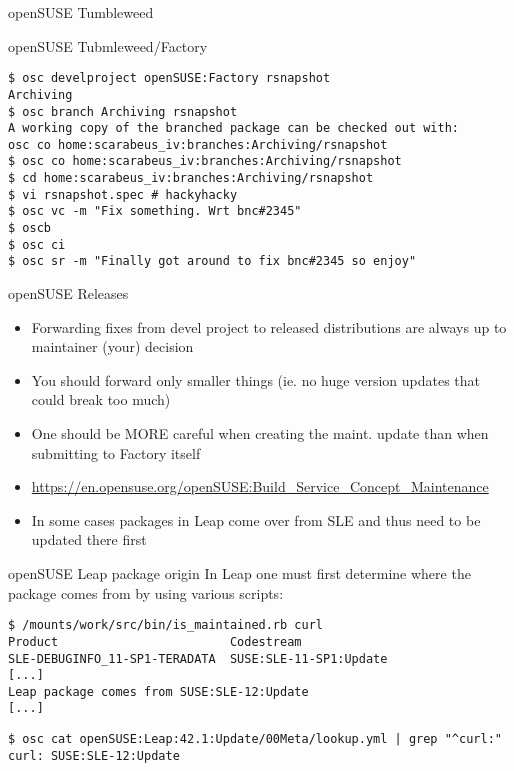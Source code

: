 \documentclass{beamer}
\begin{document}
\begin{frame}{openSUSE Tumbleweed}
\end{frame}

\begin{frame}[fragile]{openSUSE Tubmleweed/Factory}
	\begin{tiny}
	\begin{verbatim}
$ osc develproject openSUSE:Factory rsnapshot
Archiving
$ osc branch Archiving rsnapshot
A working copy of the branched package can be checked out with:
osc co home:scarabeus_iv:branches:Archiving/rsnapshot
$ osc co home:scarabeus_iv:branches:Archiving/rsnapshot
$ cd home:scarabeus_iv:branches:Archiving/rsnapshot
$ vi rsnapshot.spec # hackyhacky
$ osc vc -m "Fix something. Wrt bnc#2345"
$ oscb
$ osc ci
$ osc sr -m "Finally got around to fix bnc#2345 so enjoy"
	\end{verbatim}
	\end{tiny}
\end{frame}

\begin{frame}[t]{openSUSE Releases}
	\begin{itemize}
	\item Forwarding fixes from devel project to released distributions are always up to maintainer (your) decision
	\item You should forward only smaller things (ie. no huge version updates that could break too much)
	\item One should be MORE careful when creating the maint. update than when submitting to Factory itself
	\item \url{https://en.opensuse.org/openSUSE:Build\_Service\_Concept\_Maintenance}
	\item In some cases packages in Leap come over from SLE and thus need to be updated there first
	\end{itemize}
\end{frame}

\begin{frame}[fragile]{openSUSE Leap package origin}
In Leap one must first determine where the package comes from by using various
scripts:
\begin{small}
\begin{verbatim}$ /mounts/work/src/bin/is_maintained.rb curl
Product                        Codestream
SLE-DEBUGINFO_11-SP1-TERADATA  SUSE:SLE-11-SP1:Update
[...]
Leap package comes from SUSE:SLE-12:Update
[...]\end{verbatim}
\end{small}
\begin{small}
\begin{verbatim}$ osc cat openSUSE:Leap:42.1:Update/00Meta/lookup.yml | grep "^curl:"
curl: SUSE:SLE-12:Update\end{verbatim}
\end{small}
\end{frame}
\end{document}

